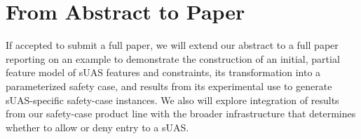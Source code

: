 \section{From Abstract to Paper}

If accepted to submit a full paper, we will extend our abstract to a full paper reporting on an example to demonstrate the construction of an initial, partial feature model of sUAS features and constraints, its transformation into a parameterized safety case, and results from its experimental use to generate sUAS-specific safety-case instances.  We also will explore integration of results from our safety-case product line with the broader infrastructure that determines whether to allow or deny entry to a sUAS.   




